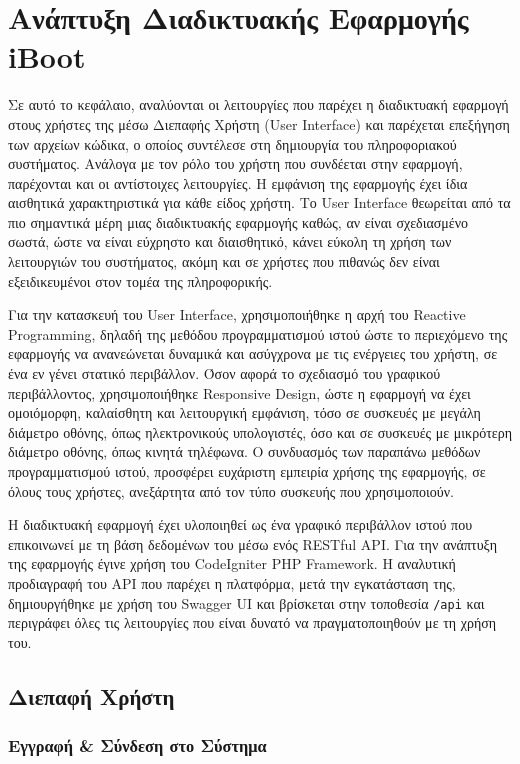 \chapter{Ανάπτυξη Διαδικτυακής Εφαρμογής iBoot}
Σε αυτό το κεφάλαιο, αναλύονται οι λειτουργίες που παρέχει η διαδικτυακή εφαρμογή στους χρήστες της μέσω Διεπαφής Χρήστη (User Interface) και παρέχεται επεξήγηση των αρχείων κώδικα, ο οποίος συντέλεσε στη δημιουργία του πληροφοριακού συστήματος. Ανάλογα με τον ρόλο του χρήστη που συνδέεται στην εφαρμογή, παρέχονται και οι αντίστοιχες λειτουργίες. Η εμφάνιση της εφαρμογής έχει ίδια αισθητικά χαρακτηριστικά για κάθε είδος χρήστη. Το User Interface θεωρείται από τα πιο σημαντικά μέρη μιας διαδικτυακής εφαρμογής καθώς, αν είναι σχεδιασμένο σωστά, ώστε να είναι εύχρηστο και διαισθητικό, κάνει εύκολη τη χρήση των λειτουργιών του συστήματος, ακόμη και σε χρήστες που πιθανώς δεν είναι εξειδικευμένοι στον τομέα της πληροφορικής.

Για την κατασκευή του User Interface, χρησιμοποιήθηκε η αρχή του Reactive Programming, δηλαδή της μεθόδου προγραμματισμού ιστού ώστε το περιεχόμενο της εφαρμογής να ανανεώνεται δυναμικά και ασύγχρονα με τις ενέργειες του χρήστη, σε ένα εν γένει στατικό περιβάλλον. Όσον αφορά το σχεδιασμό του γραφικού περιβάλλοντος, χρησιμοποιήθηκε Responsive Design, ώστε η εφαρμογή να έχει ομοιόμορφη, καλαίσθητη και λειτουργική εμφάνιση, τόσο σε συσκευές με μεγάλη διάμετρο οθόνης, όπως ηλεκτρονικούς υπολογιστές, όσο και σε συσκευές με μικρότερη διάμετρο οθόνης, όπως κινητά τηλέφωνα. Ο συνδυασμός των παραπάνω μεθόδων προγραμματισμού ιστού, προσφέρει ευχάριστη εμπειρία χρήσης της εφαρμογής, σε όλους τους χρήστες, ανεξάρτητα από τον τύπο συσκευής που χρησιμοποιούν.

Η διαδικτυακή εφαρμογή έχει υλοποιηθεί ως ένα γραφικό περιβάλλον ιστού που επικοινωνεί με τη βάση δεδομένων του μέσω ενός RESTful API. Για την ανάπτυξη της εφαρμογής έγινε χρήση του CodeIgniter PHP Framework. Η αναλυτική προδιαγραφή του API που παρέχει η πλατφόρμα, μετά την εγκατάσταση της, δημιουργήθηκε με χρήση του Swagger UI και βρίσκεται στην τοποθεσία \texttt{/api} και περιγράφει όλες τις λειτουργίες που είναι δυνατό να πραγματοποιηθούν με τη χρήση του.

\section{Διεπαφή Χρήστη}

\subsection{Εγγραφή \& Σύνδεση στο Σύστημα}

